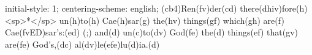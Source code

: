 initial-style: 1;
centering-scheme: english;
(cb4)Ren(fv)der(cd) there(dhiv)fore(h) <sp>*</sp> un(h)to(h) Cae(h)sar(g) the(hv) things(gf) which(gh) are(f) Cae(fvED)sar's:(ed) (;) and(d) un(c)to(dv) God(fe) the(d) things(ef) that(gv) are(fe) God's,(dc) al(dv)le(efe)lu(d)ia.(d)
